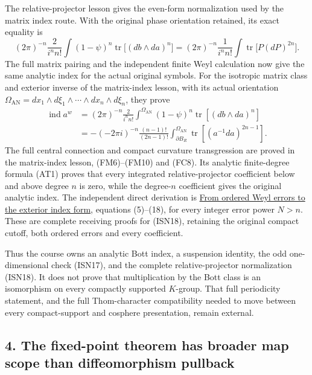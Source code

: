 \documentclass[
  11pt,
]{article}
\begin{document}
The relative-projector lesson gives the even-form normalization used by
the matrix index route. With the original phase orientation retained,
its exact equality is \[
 (2\pi)^{-n}\frac{2}{i^n n!}
 \int (1-\psi)^n\operatorname{tr}\!\bigl[(db\wedge da)^n\bigr]
 =
 (2\pi)^{-n}\frac{1}{i^n n!}
 \int\operatorname{tr}\!\bigl[P(dP)^{2n}\bigr].
 \tag{ISN18}
\] The full matrix pairing and the independent finite Weyl calculation
now give the same analytic index for the actual original symbols. For
the isotropic matrix class and exterior inverse of the matrix-index
lesson, with its actual orientation
\(\Omega_{\mathrm{AN}}=dx_1\wedge d\xi_1\wedge\cdots
\wedge dx_n\wedge d\xi_n\), they prove \[
 \begin{aligned}
 \operatorname{ind}a^w
 &=(2\pi)^{-n}\frac{2}{i^n n!}
       \int^{\Omega_{\mathrm{AN}}}
          (1-\psi)^n\operatorname{tr}[(db\wedge da)^n]\\
 &=-(-2\pi i)^{-n}\frac{(n-1)!}{(2n-1)!}
       \int_{\partial B_R}^{\Omega_{\mathrm{AN}}}
          \operatorname{tr}[(a^{-1}da)^{2n-1}].
 \end{aligned}
 \tag{ISS3}
\] The full central connection and compact curvature transgression are
proved in the matrix-index lesson, (FM6)--(FM10) and (FC8). Its analytic
finite-degree formula (AT1) proves that every integrated
relative-projector coefficient below and above degree \(n\) is zero,
while the degree-\(n\) coefficient gives the original analytic index.
The independent direct derivation is
\href{ordered-weyl-exterior-reduction.pdf}{From ordered Weyl errors to
the exterior index form}, equations (5)--(18), for every integer error
power \(N>n\). These are complete receiving proofs for (ISN18),
retaining the original compact cutoff, both ordered errors and every
coefficient.

Thus the course owns an analytic Bott index, a suspension identity, the
odd one-dimensional check (ISN17), and the complete relative-projector
normalization (ISN18). It does not prove that multiplication by the Bott
class is an isomorphism on every compactly supported \(K\)-group. That
full periodicity statement, and the full Thom-character compatibility
needed to move between every compact-support and cosphere presentation,
remain external.

\subsection{4. The fixed-point theorem has broader map scope than
diffeomorphism
pullback}\label{the-fixed-point-theorem-has-broader-map-scope-than-diffeomorphism-pullback}
\end{document}
